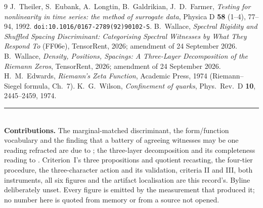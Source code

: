 \documentclass[11pt]{article}
\theoremstyle{remark}
\begin{document}
\begin{thebibliography}{9}
 J.~Theiler, S.~Eubank, A.~Longtin, B.~Galdrikian, J.~D.~Farmer,
  \emph{Testing for nonlinearity in time series: the method of surrogate data},
  Physica D \textbf{58} (1--4), 77--94, 1992. \texttt{doi:10.1016/0167-2789(92)90102-S}.
 B.~Wallace, \emph{Spectral Rigidity and Shuffled Spacing Discriminant:
  Categorising Spectral Witnesses by What They Respond To} (FF06e), TensorRent, 2026;
  amendment of 24 September 2026.
 B.~Wallace, \emph{Density, Positions, Spacings: A Three-Layer
  Decomposition of the Riemann Zeros}, TensorRent, 2026; amendment of 24 September 2026.
 H.~M.~Edwards, \emph{Riemann's Zeta Function}, Academic Press, 1974
  (Riemann--Siegel formula, Ch.~7).
 K.~G.~Wilson, \emph{Confinement of quarks},
  Phys.\ Rev.\ D \textbf{10}, 2445--2459, 1974.
\end{thebibliography}

\vspace{1em}\noindent\rule{\linewidth}{0.4pt}\\[2pt]
\small\textbf{Contributions.} The marginal-matched discriminant, the form/function
vocabulary and the finding that a battery of agreeing witnesses may be one reading
refracted are due to \cite{ff06e}; the three-layer decomposition and its completeness
reading to \cite{threelayer}. Criterion~I's three propositions and quotient recasting,
the four-tier procedure, the three-character action and its validation, criteria II and
III, both instruments, all six figures and the artifact localisation are this record's.
Byline deliberately unset. Every figure is emitted by the measurement that produced it;
no number here is quoted from memory or from a source not opened.
\end{document}
